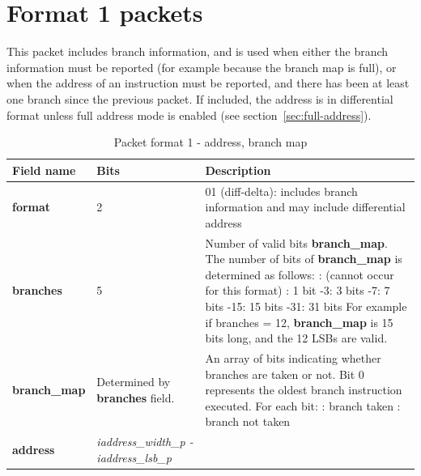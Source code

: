 \FloatBarrier
\section{Format 1 packets} \label{sec:format1}

This packet includes branch information, and is used when either the branch information must be reported 
(for example because the branch map is full), or when the address of an instruction must be reported, and there has 
been at least one branch since the previous packet.  If included, the address is in differential format unless full 
address mode is enabled (see section~\ref{sec:full-address}).

\begin{table}[htp]
  \centering
  \caption{Packet format 1 - address, branch map}
  \label{tab:te_inst1-addr-map}
  \begin{tabulary}{\textwidth}{|l|p{35mm}|p{90mm}|}
    \hline
    {\bf Field name} & {\bf Bits} & {\bf Description} \\
    \hline
    \textbf{format}	& 2	& 01 (diff-delta): includes branch information and may include differential address\\
    \hline
    \textbf{branches} & 5 & Number of valid bits \textbf{branch\_map}. The number of bits of \textbf{branch\_map} is determined as follows: :	   (cannot occur for this format) :	   1 bit -3:   3 bits -7:   7 bits -15:  15 bits -31: 31 bits \newline
    For example if branches = 12, \textbf{branch\_map} is 15 bits long, and the 12 LSBs are valid. \\
    \hline
    \textbf{branch\_map} & Determined by \newline 
                 \textbf{branches} field. & 
                 An array of bits indicating whether branches are taken or not.\newline
    Bit 0 represents the oldest branch instruction executed.   For each bit: : branch taken : branch not taken \\
    \hline
    \textbf{address}	& \textit {iaddress\_width\_p - iaddress\_lsb\_p} & 

\end{tabulary}
\end{table}
